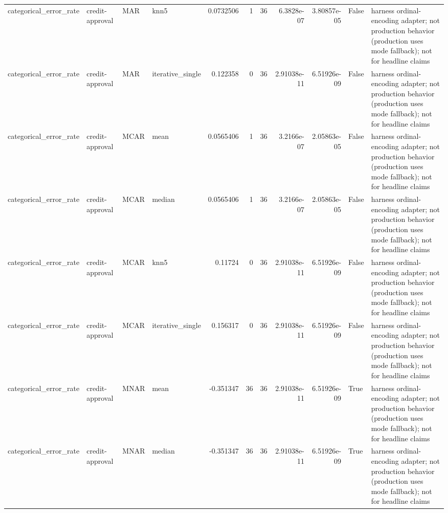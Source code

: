 \begin{table}[ht]
\begin{tabular}{llllrrrrrll}
 categorical\_error\_rate & credit-approval      & MAR         & knn5             &      0.0732506   &                   1 &      36 & 6.3828e-07  & 3.80857e-05 & False              & harness ordinal-encoding adapter; not production behavior (production uses mode fallback); not for headline claims \\
 categorical\_error\_rate & credit-approval      & MAR         & iterative\_single &      0.122358    &                   0 &      36 & 2.91038e-11 & 6.51926e-09 & False              & harness ordinal-encoding adapter; not production behavior (production uses mode fallback); not for headline claims \\
 categorical\_error\_rate & credit-approval      & MCAR        & mean             &      0.0565406   &                   1 &      36 & 3.2166e-07  & 2.05863e-05 & False              & harness ordinal-encoding adapter; not production behavior (production uses mode fallback); not for headline claims \\
 categorical\_error\_rate & credit-approval      & MCAR        & median           &      0.0565406   &                   1 &      36 & 3.2166e-07  & 2.05863e-05 & False              & harness ordinal-encoding adapter; not production behavior (production uses mode fallback); not for headline claims \\
 categorical\_error\_rate & credit-approval      & MCAR        & knn5             &      0.11724     &                   0 &      36 & 2.91038e-11 & 6.51926e-09 & False              & harness ordinal-encoding adapter; not production behavior (production uses mode fallback); not for headline claims \\
 categorical\_error\_rate & credit-approval      & MCAR        & iterative\_single &      0.156317    &                   0 &      36 & 2.91038e-11 & 6.51926e-09 & False              & harness ordinal-encoding adapter; not production behavior (production uses mode fallback); not for headline claims \\
 categorical\_error\_rate & credit-approval      & MNAR        & mean             &     -0.351347    &                  36 &      36 & 2.91038e-11 & 6.51926e-09 & True               & harness ordinal-encoding adapter; not production behavior (production uses mode fallback); not for headline claims \\
 categorical\_error\_rate & credit-approval      & MNAR        & median           &     -0.351347    &                  36 &      36 & 2.91038e-11 & 6.51926e-09 & True               & harness ordinal-encoding adapter; not production behavior (production uses mode fallback); not for headline claims \\

\end{tabular}
\end{table}
